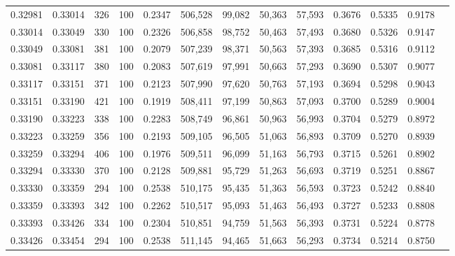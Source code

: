 \begin{tabular}{rrrrrrrrrrrrr}
0.32981 & 0.33014 &   326 & 100 &                                     0.2347 & 506,528 &  99,082 &  50,363 &  57,593 & 0.3676 & 0.5335 & 0.9178 \\
0.33014 & 0.33049 &   330 & 100 &                                     0.2326 & 506,858 &  98,752 &  50,463 &  57,493 & 0.3680 & 0.5326 & 0.9147 \\
0.33049 & 0.33081 &   381 & 100 &                                     0.2079 & 507,239 &  98,371 &  50,563 &  57,393 & 0.3685 & 0.5316 & 0.9112 \\
0.33081 & 0.33117 &   380 & 100 &                                     0.2083 & 507,619 &  97,991 &  50,663 &  57,293 & 0.3690 & 0.5307 & 0.9077 \\
0.33117 & 0.33151 &   371 & 100 &                                     0.2123 & 507,990 &  97,620 &  50,763 &  57,193 & 0.3694 & 0.5298 & 0.9043 \\
0.33151 & 0.33190 &   421 & 100 &                                     0.1919 & 508,411 &  97,199 &  50,863 &  57,093 & 0.3700 & 0.5289 & 0.9004 \\
0.33190 & 0.33223 &   338 & 100 &                                     0.2283 & 508,749 &  96,861 &  50,963 &  56,993 & 0.3704 & 0.5279 & 0.8972 \\
0.33223 & 0.33259 &   356 & 100 &                                     0.2193 & 509,105 &  96,505 &  51,063 &  56,893 & 0.3709 & 0.5270 & 0.8939 \\
0.33259 & 0.33294 &   406 & 100 &                                     0.1976 & 509,511 &  96,099 &  51,163 &  56,793 & 0.3715 & 0.5261 & 0.8902 \\
0.33294 & 0.33330 &   370 & 100 &                                     0.2128 & 509,881 &  95,729 &  51,263 &  56,693 & 0.3719 & 0.5251 & 0.8867 \\
0.33330 & 0.33359 &   294 & 100 &                                     0.2538 & 510,175 &  95,435 &  51,363 &  56,593 & 0.3723 & 0.5242 & 0.8840 \\
0.33359 & 0.33393 &   342 & 100 &                                     0.2262 & 510,517 &  95,093 &  51,463 &  56,493 & 0.3727 & 0.5233 & 0.8808 \\
0.33393 & 0.33426 &   334 & 100 &                                     0.2304 & 510,851 &  94,759 &  51,563 &  56,393 & 0.3731 & 0.5224 & 0.8778 \\
0.33426 & 0.33454 &   294 & 100 &                                     0.2538 & 511,145 &  94,465 &  51,663 &  56,293 & 0.3734 & 0.5214 & 0.8750 \\

\end{tabular}
